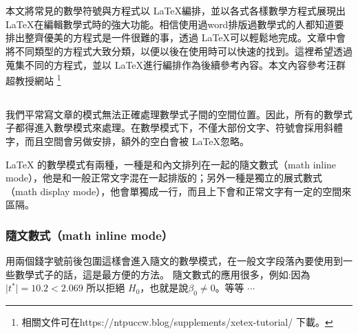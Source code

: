 \chapter{}
本文將常見的數學符號與方程式以 \LaTeX 編排，並以各式各樣數學方程式展現出 \LaTeX 在編輯數學式時的強大功能。相信使用過word排版過數學式的人都知道要排出整齊優美的方程式是一件很難的事，透過 \LaTeX 可以輕鬆地完成。文章中會將不同類型的方程式大致分類，以便以後在使用時可以快速的找到。這裡希望透過蒐集不同的方程式，並以 \LaTeX 進行編排作為後續參考內容。本文內容參考汪群超教授網站 \footnote{相關文件可在https://ntpuccw.blog/supplements/xetex-tutorial/ 下載。}\\

\section{}
我們平常寫文章的模式無法正確處理數學式子間的空間位置。因此，所有的數學式子都得進入數學模式來處理。在數學模式下，不僅大部份文字、符號會採用斜體字，而且空間會另做安排，額外的空白會被 \LaTeX  忽略。\smallskip

LaTeX 的數學模式有兩種，一種是和內文排列在一起的隨文數式（math inline mode），他是和一般正常文字混在一起排版的；另外一種是獨立的展式數式（math display mode），他會單獨成一行，而且上下會和正常文字有一定的空間來區隔。

\subsection{隨文數式（math inline mode）}
用兩個錢字號前後包圍這樣會進入隨文的數學模式，在一般文字段落內要使用到一些數學式子的話，這是最方便的方法。
隨文數式的應用很多，例如:因為 $\lvert t^{*}\rvert=10.2 < 2.069$ 所以拒絕 $H_0$，也就是說$\beta_0 \neq 0$。等等 $\cdots$

